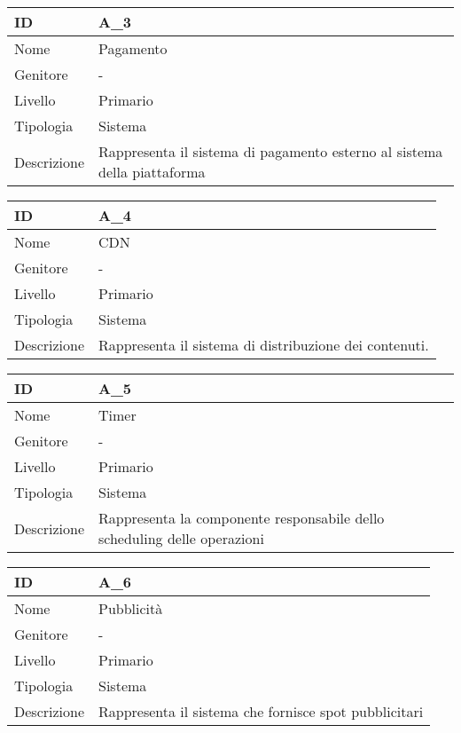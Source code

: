 \begin{center}
\begin{tabular}{ |p{2cm}|p{10cm}|  }
\hline
ID & A\_3 \\\hline
Nome & Pagamento\\\hline
Genitore & - \\\hline
Livello &  Primario \\\hline
Tipologia & Sistema \\\hline
Descrizione &  Rappresenta il sistema di pagamento esterno al sistema della piattaforma \\\hline
\end{tabular}
\label{table_attore:3}\newline

\begin{tabular}{ |p{2cm}|p{10cm}|  }
\hline
ID & A\_4 \\\hline
Nome & CDN\\\hline
Genitore & - \\\hline
Livello &  Primario \\\hline
Tipologia & Sistema \\\hline
Descrizione &  Rappresenta il sistema di distribuzione dei contenuti. \\\hline
\end{tabular}
\label{table_attore:5}\newline

\begin{tabular}{ |p{2cm}|p{10cm}|  }
\hline
ID & A\_5 \\\hline
Nome & Timer\\\hline
Genitore & - \\\hline
Livello &  Primario \\\hline
Tipologia & Sistema \\\hline
Descrizione &  Rappresenta la componente responsabile dello scheduling delle operazioni \\\hline
\end{tabular}
\label{table_attore:6}\newline

\begin{tabular}{ |p{2cm}|p{10cm}|  }
\hline
ID & A\_6 \\\hline
Nome & Pubblicità \\\hline
Genitore & - \\\hline
Livello &  Primario \\\hline
Tipologia & Sistema \\\hline
Descrizione &  Rappresenta il sistema che fornisce spot pubblicitari \\\hline
\end{tabular}
\label{table_attore:7}\newline

\end{center}

